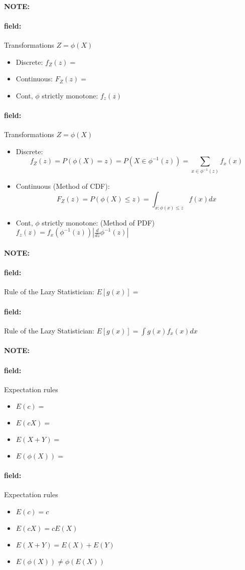 \documentclass[12pt]{article}
\newenvironment{note}{\paragraph{NOTE:}}{}
\newenvironment{field}{\paragraph{field:}}{}
\begin{document}
\begin{note}
  \begin{field}
     Transformations $Z = \phi(X)$

    \begin{itemize}
      \item Discrete: $f_Z(z) = $
      \item Continuous: $F_Z(z)=$
      \item Cont, $\phi$ strictly monotone:
      $f_z(z)$
    \end{itemize}
  \end{field}
  \begin{field}
    Transformations $Z = \phi(X)$
  \begin{itemize}
    \item Discrete: $$f_Z(z) = P(\phi(X) = z) = P(X \in \phi^{-1}(z)) = \sum_{x \in \phi^{-1}(z)}f_x(x) $$
    \item Continuous (Method of CDF): $$F_Z(z)= P(\phi(X)\leq z) = \int_{x:\phi(x)\leq z} f(x) dx$$
    \item Cont, $\phi$ strictly monotone: (Method of PDF)
    $f_z(z) = f_x(\phi^{-1}(z))|\frac{d}{dz} \phi^{-1}(z)|$
  \end{itemize}
\end{field}
\end{note}

\begin{note}
  \begin{field}
     Rule of the Lazy Statistician: $ E[g(x)] = $
  \end{field}
  \begin{field}
    Rule of the Lazy Statistician:  $E[g(x)] = \int g(x)f_x(x)dx$
  \end{field}
\end{note}

\begin{note}
  \begin{field}
    Expectation rules
    \begin{itemize}
      \item $E(c) = $
      \item $E(cX) = $
      \item $E(X + Y) = $
      \item $E(\phi(X)) = $
    \end{itemize}
  \end{field}
  \begin{field}
    Expectation rules
    \begin{itemize}
      \item $E(c) = c$
      \item $E(cX) = cE(X)$
      \item $E(X + Y) = E(X) + E(Y)$
      \item $E(\phi(X)) \neq \phi(E(X))$
    \end{itemize}
  \end{field}
\end{note}
\end{document}

